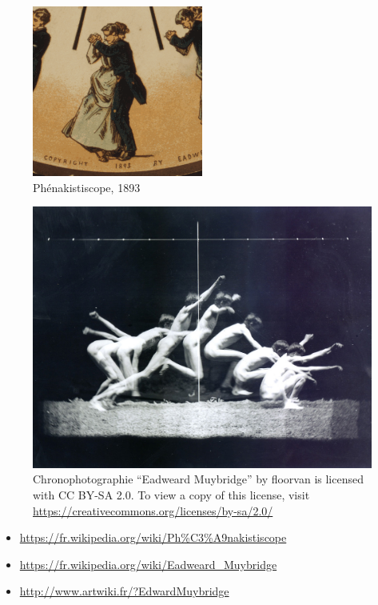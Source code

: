 \documentclass[
  french,
]{book}
\providecommand{\tightlist}{%
  \setlength{\itemsep}{0pt}\setlength{\parskip}{0pt}}
\begin{document}
\begin{figure}
\centering
\includegraphics[width=0.5\textwidth,height=\textheight]{medias/corpus/muybridge/Phenakistoscope.gif}
\caption{Phénakistiscope, 1893}
\end{figure}

\begin{figure}
\centering
\includegraphics{medias/corpus/muybridge/3695958436_43ae8a57db_b.jpg}
\caption{Chronophotographie ``Eadweard Muybridge'' by floorvan is licensed with CC BY-SA 2.0. To view a copy of this license, visit \url{https://creativecommons.org/licenses/by-sa/2.0/}}
\end{figure}

\begin{itemize}
\tightlist
\item
  \url{https://fr.wikipedia.org/wiki/Ph\%C3\%A9nakistiscope}
\item
  \url{https://fr.wikipedia.org/wiki/Eadweard_Muybridge}
\item
  \url{http://www.artwiki.fr/?EdwardMuybridge}
\end{itemize}
\end{document}
